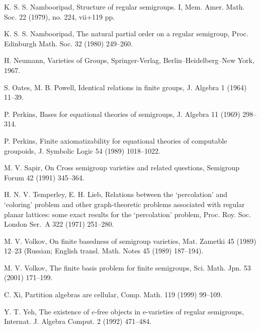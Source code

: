 \documentclass[preprint,1p,times]{elsarticle}
\numberwithin{equation}{section}
\theoremstyle{remark}
\begin{document}
\begin{thebibliography}{99}
K. S. S. Nambooripad, Structure of regular semigroups. I, Mem. Amer. Math. Soc. 22 (1979), no. 224, vii+119 pp.

K. S. S. Nambooripad, The natural partial order on a regular semigroup, Proc. Edinburgh Math. Soc. 32 (1980) 249--260.

H. Neumann, Varieties of Groups, Springer-Verlag, Berlin--Heidelberg--New York, 1967.

S. Oates, M. B. Powell, Identical relations in finite groups, J. Algebra 1 (1964) 11--39.

P. Perkins, Bases for equational theories of semigroups, J. Algebra 11 (1969) 298--314.

P. Perkins, Finite axiomatizability for equational theories of computable groupoids, J. Symbolic Logic 54 (1989)
1018--1022.



M. V. Sapir, On Cross semigroup varieties and related questions, Semigroup Forum 42 (1991) 345--364.

H. N. V. Temperley, E. H. Lieb, Relations between the `percolation' and `coloring' problem and other graph-theoretic
problems associated with regular planar lattices: some exact results for the `percolation' problem, Proc. Roy. Soc.
London Ser.~A  322 (1971) 251--280.

M. V. Volkov, On finite basedness of semigroup varieties, Mat. Zametki 45 (1989) 12--23 (Russian; English transl. Math.
Notes 45 (1989) 187--194).

M. V. Volkov, The finite basis problem for finite semigroups, Sci. Math. Jpn. 53 (2001) 171--199.

C. Xi, Partition algebras are cellular, Comp. Math. 119 (1999) 99--109.

Y. T. Yeh, The existence of $e$-free objects in e-varieties of regular semigroups, Internat. J. Algebra Comput. 2
(1992) 471--484.

\end{thebibliography}
\end{document}
